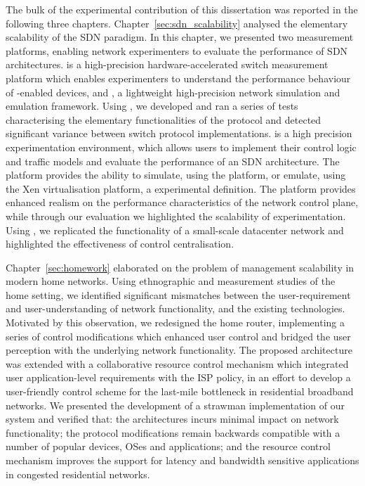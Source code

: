 The bulk of the experimental contribution of this dissertation was reported in
the following three chapters. Chapter~\ref{sec:sdn_scalability} analysed the
elementary scalability of the SDN paradigm. In this chapter, we presented two
measurement platforms, enabling network experimenters to evaluate the
performance of SDN architectures. \oflops is a high-precision
hardware-accelerated \of switch measurement platform which enables experimenters
to understand the performance behaviour of \of-enabled devices, and \sdnsim, a
lightweight high-precision network simulation and emulation framework. Using
\oflops, we developed and ran a series of tests characterising the elementary
functionalities of the \of protocol and detected significant variance between
switch protocol implementations. \sdnsim is a high precision experimentation
environment, which allows users to implement their control logic and traffic
models and evaluate the performance of an SDN architecture. The platform
provides the ability to simulate, using the  platform, or emulate, using
the Xen virtualisation platform, a experimental definition.  The platform
provides enhanced realism on the performance characteristics of the network
control plane, while through our evaluation we highlighted the scalability of
experimentation.  Using \sdnsim, we replicated the functionality of a small-scale
datacenter network and highlighted the effectiveness of control centralisation.

Chapter~\ref{sec:homework} elaborated on the problem of management scalability in
modern home networks. Using ethnographic and measurement studies of the home
setting, we identified significant mismatches between the user-requirement and
user-understanding of network functionality, and the existing technologies.
Motivated by this observation, we redesigned the home router, implementing a
series of control modifications which enhanced user control and bridged the user
perception with the underlying network functionality. The proposed architecture
was extended with a collaborative resource control mechanism which integrated
user application-level requirements with the ISP policy, in an effort to
develop a user-friendly control scheme for the last-mile bottleneck in
residential broadband networks. We presented the development of a strawman
implementation of our system and verified that: the architectures incurs minimal
impact on network functionality; the protocol modifications remain
backwards compatible with a number of popular devices, OSes and applications; and
 the resource control mechanism improves the support for latency and
bandwidth sensitive applications in congested residential networks. 

